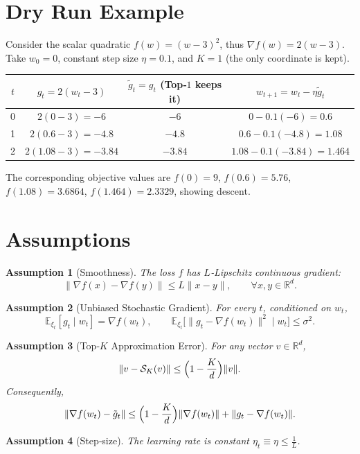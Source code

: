 \documentclass{article}
\newtheorem{assumption}{Assumption}
\newcommand{\E}{\mathbb{E}}
\newcommand{\R}{\mathbb{R}}
\begin{document}
\section*{Dry Run Example}
Consider the scalar quadratic $f(w)=(w-3)^{2}$, thus $\nabla f(w)=2(w-3)$.  
Take $w_{0}=0$, constant step size $\eta=0.1$, and $K=1$ (the only coordinate is kept).

\begin{center}
\begin{tabular}{c|c|c|c}
$t$ & $g_{t}=2(w_{t}-3)$ & $\tilde g_{t}=g_{t}$ (Top‑$1$ keeps it) & $w_{t+1}=w_{t}-\eta\tilde g_{t}$ \\ \hline
0 & $2(0-3)=-6$ & $-6$ & $0-0.1(-6)=0.6$ \\
1 & $2(0.6-3)=-4.8$ & $-4.8$ & $0.6-0.1(-4.8)=1.08$ \\
2 & $2(1.08-3)=-3.84$ & $-3.84$ & $1.08-0.1(-3.84)=1.464$ \\
\end{tabular}
\end{center}
The corresponding objective values are $f(0)=9$, $f(0.6)=5.76$, $f(1.08)=3.6864$, $f(1.464)=2.3329$, showing descent.

\vspace{1em}
\section*{Assumptions}
\begin{assumption}[Smoothness]\label{as:smooth}
The loss $f$ has $L$‑Lipschitz continuous gradient:
\[
\|\nabla f(x)-\nabla f(y)\|\le L\|x-y\|,\qquad\forall x,y\in\R^{d}.
\]
\end{assumption}
\begin{assumption}[Unbiased Stochastic Gradient]\label{as:unbiased}
For every $t$, conditioned on $w_{t}$,
\[
\E_{\xi_{t}}[g_{t}\mid w_{t}]=\nabla f(w_{t}),\qquad
\E_{\xi_{t}}\big[\|g_{t}-\nabla f(w_{t})\|^{2}\mid w_{t}\big]\le\sigma^{2}.
\]
\end{assumption}
\begin{assumption}[Top‑$K$ Approximation Error]\label{as:topk}
For any vector $v\in\R^{d}$,
\[
\|v-\mathcal{S}_{K}(v)\|\le \Bigl(1-\frac{K}{d}\Bigr)\|v\|.
\]
Consequently,
\[
\|\nabla f(w_{t})-\tilde g_{t}\|\le\Bigl(1-\frac{K}{d}\Bigr)\|\nabla f(w_{t})\|+ \|g_{t}-\nabla f(w_{t})\|.
\]
\end{assumption}
\begin{assumption}[Step‑size]\label{as:stepsize}
The learning rate is constant $\eta_{t}\equiv\eta\le\frac{1}{L}$.
\end{assumption}
\end{document}

